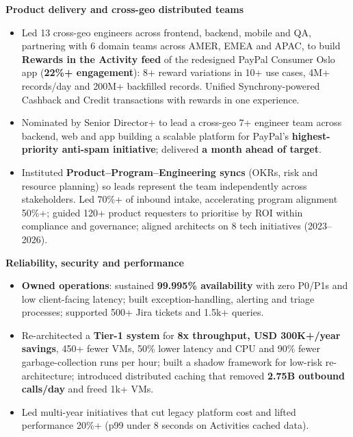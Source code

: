\documentclass[10pt,a4paper]{article}
\newcommand{\bd}[1]{\textbf{#1}}
\newcommand{\subhead}[1]{%
  \par\vspace{4pt}\noindent\textcolor{rolecolor}{\textbf{#1}}\par\nopagebreak\vspace{0.5pt}}
\begin{document}
\subhead{Product delivery and cross-geo distributed teams}
\begin{itemize}
\item Led 13 cross-geo engineers across frontend, backend, mobile and QA, partnering with 6
  domain teams across AMER, EMEA and APAC, to build \bd{Rewards in the Activity feed} of the
  redesigned PayPal Consumer Oslo app (\bd{22\%+ engagement}): 8+ reward variations in 10+ use cases,
  4M+ records/day and 200M+ backfilled records. Unified Synchrony-powered Cashback and Credit
  transactions with rewards in one experience.
\item Nominated by Senior Director+ to lead a cross-geo 7+ engineer team across
  backend, web and app building a scalable platform for PayPal's \bd{highest-priority anti-spam
  initiative}; delivered \bd{a month ahead of target}.
\item Instituted \bd{Product--Program--Engineering syncs} (OKRs, risk and resource planning) so
  leads represent the team independently across stakeholders. Led 70\%+ of inbound intake,
  accelerating program alignment 50\%+; guided 120+ product requesters to prioritise by ROI within
  compliance and governance; aligned architects on 8 tech initiatives (2023--2026).
\end{itemize}

\subhead{Reliability, security and performance}
\begin{itemize}
\item \bd{Owned operations}: sustained \bd{99.995\% availability} with zero P0/P1s and low
  client-facing latency; built exception-handling, alerting and triage processes; supported
  500+ Jira tickets and 1.5k+ queries.
\item Re-architected a \bd{Tier-1 system} for \bd{8x throughput, USD 300K+/year savings}, 450+
  fewer VMs, 50\% lower latency and CPU and 90\% fewer garbage-collection runs per hour; built a
  shadow framework for low-risk re-architecture; introduced distributed caching that removed
  \bd{2.75B outbound calls/day} and freed 1k+ VMs.
\item Led multi-year initiatives that cut legacy platform cost and lifted performance 20\%+
  (p99 under 8 seconds on Activities cached data).
\end{itemize}
\end{document}
